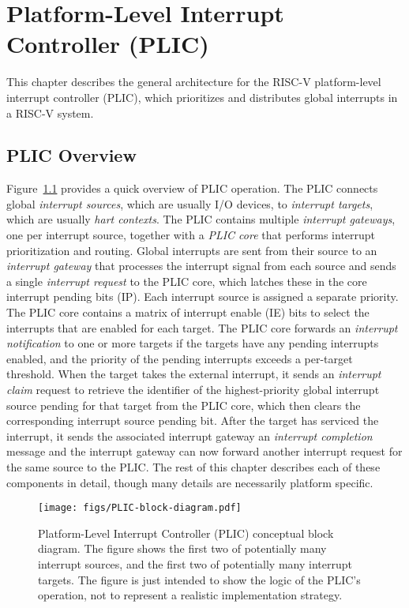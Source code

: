 \chapter{Platform-Level Interrupt Controller (PLIC)}
\label{plic}

This chapter describes the general architecture for the RISC-V
platform-level interrupt controller (PLIC), which prioritizes and
distributes global interrupts in a RISC-V system.

\section{PLIC Overview}

Figure~\ref{fig:plic} provides a quick overview of PLIC operation.
The PLIC connects global {\em interrupt sources}, which are usually
I/O devices, to {\em interrupt targets}, which are usually {\em hart
  contexts}.  The PLIC contains multiple {\em interrupt gateways}, one
per interrupt source, together with a {\em PLIC core} that performs
interrupt prioritization and routing.  Global interrupts are sent from
their source to an {\em interrupt gateway} that processes the
interrupt signal from each source and sends a single {\em interrupt
  request} to the PLIC core, which latches these in the core interrupt
pending bits (IP).  Each interrupt source is assigned a separate
priority.  The PLIC core contains a matrix of interrupt enable (IE)
bits to select the interrupts that are enabled for each target.  The
PLIC core forwards an {\em interrupt notification} to one or more
targets if the targets have any pending interrupts enabled, and the
priority of the pending interrupts exceeds a per-target threshold.
When the target takes the external interrupt, it sends an {\em
  interrupt claim} request to retrieve the identifier of the
highest-priority global interrupt source pending for that target from
the PLIC core, which then clears the corresponding interrupt source
pending bit.  After the target has serviced the interrupt, it sends
the associated interrupt gateway an {\em interrupt completion} message
and the interrupt gateway can now forward another interrupt request
for the same source to the PLIC.  The rest of this chapter describes
each of these components in detail, though many details are
necessarily platform specific.

\begin{figure}[tb]
\centering
\texttt{[image: figs/PLIC-block-diagram.pdf]}
\caption{Platform-Level Interrupt Controller (PLIC) conceptual block
  diagram.  The figure shows the first two of potentially many
  interrupt sources, and the first two of potentially many interrupt
  targets.  The figure is just intended to show the logic of the
  PLIC's operation, not to represent a realistic implementation
  strategy.}
\label{fig:plic}
\end{figure}

